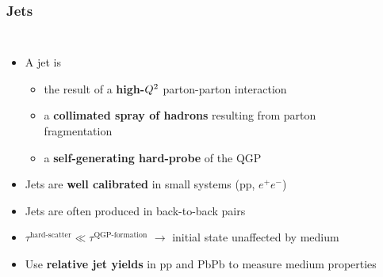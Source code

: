\begin{frame}
  \frametitle{\textbf{Jets}}
  \begin{columns}
    \begin{itemize}
    \item A jet is
      \begin{itemize}
      \item the result of a \textbf{high-}$\boldmath{Q^2}$ parton-parton interaction
      \item a \textbf{collimated spray of hadrons} resulting from parton fragmentation
      \item a \textbf{self-generating hard-probe} of the QGP
      \end{itemize}
    \item Jets are \textbf{well calibrated} in small systems (pp, $e^+ e^-$)
    \item Jets are often produced in back-to-back pairs
    \item $\tau^{\text{hard-scatter}} \ll \tau^{\text{QGP-formation}}$ $\to$ initial state unaffected by medium
    \item Use \textbf{relative jet yields} in pp and PbPb to measure medium properties
    \end{itemize}
    \centering 
    

    \



  \end{columns}







\end{frame}
